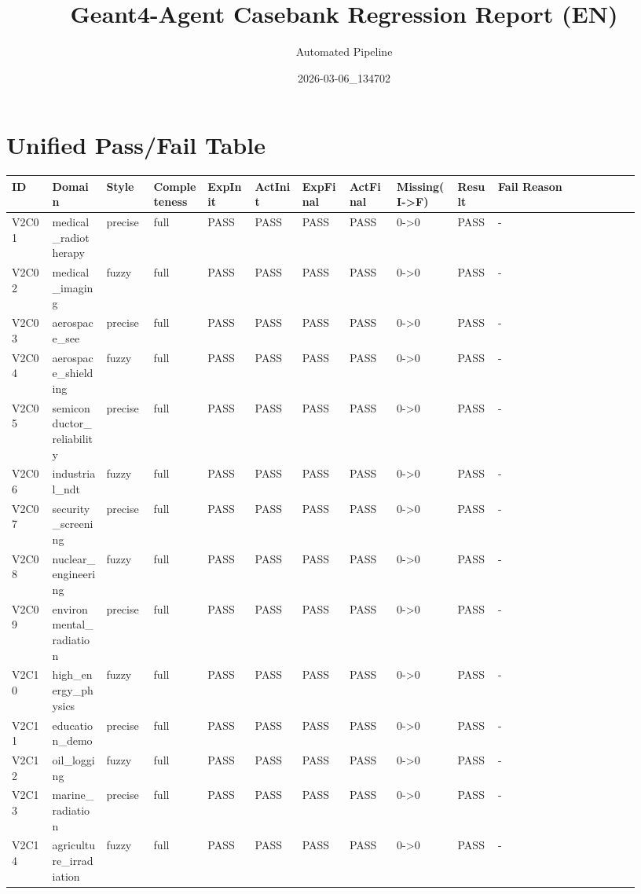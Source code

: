 \documentclass[11pt]{ctexart}
\title{Geant4-Agent Casebank Regression Report (EN)}
\author{Automated Pipeline}
\date{2026-03-06\_134702}
\begin{document}
\maketitle
\section{Unified Pass/Fail Table}
\begin{longtable}{p{0.06\linewidth}p{0.08\linewidth}p{0.07\linewidth}p{0.08\linewidth}p{0.07\linewidth}p{0.07\linewidth}p{0.07\linewidth}p{0.07\linewidth}p{0.09\linewidth}p{0.06\linewidth}p{0.21\linewidth}}
\toprule
ID & Domain & Style & Completeness & ExpInit & ActInit & ExpFinal & ActFinal & Missing(I->F) & Result & Fail Reason \\
\midrule
V2C01 & medical\_radiotherapy & precise & full & PASS & PASS & PASS & PASS & 0->0 & PASS & - \\
V2C02 & medical\_imaging & fuzzy & full & PASS & PASS & PASS & PASS & 0->0 & PASS & - \\
V2C03 & aerospace\_see & precise & full & PASS & PASS & PASS & PASS & 0->0 & PASS & - \\
V2C04 & aerospace\_shielding & fuzzy & full & PASS & PASS & PASS & PASS & 0->0 & PASS & - \\
V2C05 & semiconductor\_reliability & precise & full & PASS & PASS & PASS & PASS & 0->0 & PASS & - \\
V2C06 & industrial\_ndt & fuzzy & full & PASS & PASS & PASS & PASS & 0->0 & PASS & - \\
V2C07 & security\_screening & precise & full & PASS & PASS & PASS & PASS & 0->0 & PASS & - \\
V2C08 & nuclear\_engineering & fuzzy & full & PASS & PASS & PASS & PASS & 0->0 & PASS & - \\
V2C09 & environmental\_radiation & precise & full & PASS & PASS & PASS & PASS & 0->0 & PASS & - \\
V2C10 & high\_energy\_physics & fuzzy & full & PASS & PASS & PASS & PASS & 0->0 & PASS & - \\
V2C11 & education\_demo & precise & full & PASS & PASS & PASS & PASS & 0->0 & PASS & - \\
V2C12 & oil\_logging & fuzzy & full & PASS & PASS & PASS & PASS & 0->0 & PASS & - \\
V2C13 & marine\_radiation & precise & full & PASS & PASS & PASS & PASS & 0->0 & PASS & - \\
V2C14 & agriculture\_irradiation & fuzzy & full & PASS & PASS & PASS & PASS & 0->0 & PASS & - \\

\end{longtable}
\end{document}
